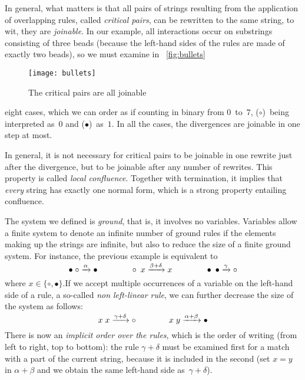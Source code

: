 In general, what matters is that all pairs of strings resulting from
the application of overlapping rules, called \emph{critical
pairs}, can be rewritten to the
same string, to wit, they are \emph{joinable}. In our example, all
interactions occur on substrings consisting of three beads (because
the left\hyp{}hand sides of the rules are made of exactly two beads),
so we must examine in \fig~\vref{fig:bullets}
\begin{figure}[b]
\centering
\texttt{[image: bullets]}
\caption{The critical pairs are all joinable}
\label{fig:bullets}
\end{figure}
eight cases, which we can order as if counting in binary from
\(0\)~to~\(7\), (\(\circ\))~being interpreted as~\(0\) and
(\(\bullet\))~as~\(1\). In all the cases, the divergences are joinable
in one step at most.

In general, it is not necessary for critical pairs to be joinable in
one rewrite just after the divergence, but to be joinable after any
number of rewrites. This property is called \emph{local
confluence}. Together
with termination, it implies that \emph{every} string has exactly one
normal form, which is a strong property entailing confluence.

The system we defined is \emph{ground}, that is, it involves no variables. Variables allow a finite
system to denote an infinite number of ground rules if the elements
making up the strings are infinite, but also to reduce the size of a
finite ground system. For instance, the previous example is equivalent
to
\begin{equation*}
\bullet \; \circ \xrightarrow{\smash{\alpha}} \bullet
\qquad\qquad
\circ \; x \xrightarrow{\smash{\beta+\delta}} x
\qquad\qquad
\bullet \; \bullet \xrightarrow{\smash{\gamma}} \circ
\end{equation*}
where \(x \in \{\circ, \bullet\}\).If we accept multiple occurrences
of a variable on the left\hyp{}hand side of a rule, a so\hyp{}called
\emph{non left\hyp{}linear rule},
we can further decrease the size of the system as follows:
\begin{equation*}
x  \; x \xrightarrow{\smash{\gamma+\delta}} \circ\qquad\qquad
x  \; y \xrightarrow{\smash{\alpha+\beta}} \bullet
\end{equation*}
There is now an \emph{implicit order over the rules}, which is the
order of writing (from left to right, top to bottom): the
rule \(\gamma+\delta\) must be examined first for a match with a part
of the current string, because it is included in the second (set
\(x=y\) in \(\alpha+\beta\) and we obtain the same left\hyp{}hand side
as~\(\gamma+\delta\)).

